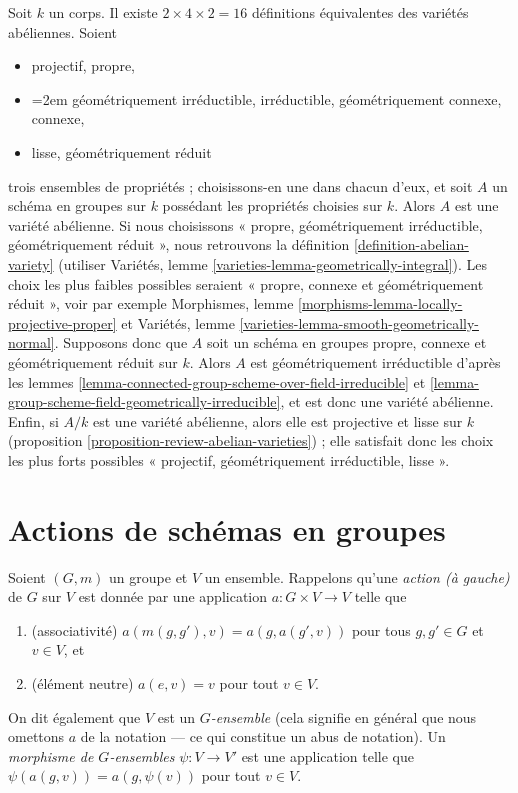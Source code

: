 \begin{remark}
\label{remark-16-equivalent}
Soit $k$ un corps. Il existe $2 \times 4 \times 2 = 16$ définitions
équivalentes des variétés abéliennes. Soient
\begin{itemize}
\item projectif, propre,
\item {\emergencystretch=2em géométriquement irréductible, irréductible, géométriquement connexe,
connexe,\par}
\item lisse, géométriquement réduit
\end{itemize}
trois ensembles de propriétés ; choisissons-en une dans chacun d'eux, et soit $A$
un schéma en groupes sur $k$ possédant les propriétés choisies sur $k$.
Alors $A$ est une variété abélienne.
Si nous choisissons « propre, géométriquement irréductible, géométriquement
réduit », nous retrouvons la définition \ref{definition-abelian-variety}
(utiliser Variétés, lemme \ref{varieties-lemma-geometrically-integral}).
Les choix les plus faibles possibles seraient « propre, connexe
et géométriquement réduit », voir par exemple
Morphismes, lemme \ref{morphisms-lemma-locally-projective-proper} et
Variétés, lemme \ref{varieties-lemma-smooth-geometrically-normal}.
Supposons donc que $A$ soit un schéma en groupes propre, connexe
et géométriquement réduit sur $k$.
Alors $A$ est géométriquement irréductible d'après les
lemmes \ref{lemma-connected-group-scheme-over-field-irreducible} et
\ref{lemma-group-scheme-field-geometrically-irreducible},
et est donc une variété abélienne.
Enfin, si $A/k$ est une variété abélienne, alors elle est projective
et lisse sur $k$ (proposition
\ref{proposition-review-abelian-varieties}) ; elle satisfait donc
les choix les plus forts possibles « projectif, géométriquement irréductible, lisse ».
\end{remark}







\section{Actions de schémas en groupes}
\label{section-action-group-scheme}

\noindent
Soient $(G, m)$ un groupe et $V$ un ensemble.
Rappelons qu'une {\it action (à gauche)} de $G$ sur $V$ est donnée
par une application $a : G \times V \to V$ telle que
\begin{enumerate}
\item (associativité) $a(m(g, g'), v) = a(g, a(g', v))$ pour tous
$g, g' \in G$ et $v \in V$, et
\item (élément neutre) $a(e, v) = v$ pour tout $v \in V$.
\end{enumerate}
On dit également que $V$ est un {\it $G$-ensemble} (cela signifie en général que nous
omettons $a$ de la notation --- ce qui constitue un abus de notation).
Un {\it morphisme de $G$-ensembles} $\psi : V \to V'$ est une application
telle que $\psi(a(g, v)) = a(g, \psi(v))$ pour tout $v \in V$.

